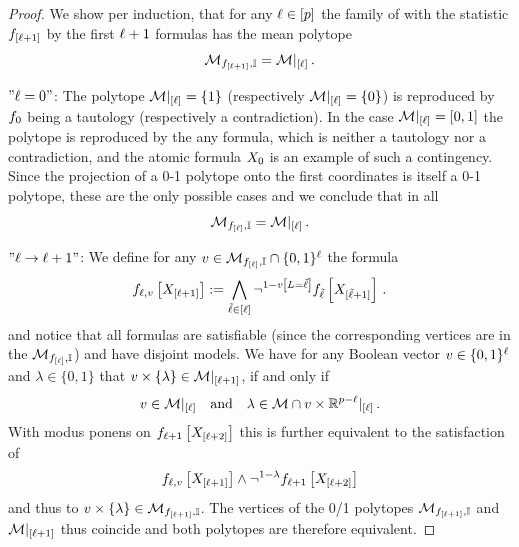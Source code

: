 \begin{proof}
    We show per induction, that for any $\ell\in[p]$ the family of \HybridLogicNetworks{} with the statistic $f_{[\ell+1]}$ by the first $\ell+1$ formulas has the mean polytope
    \begin{align}
        \label{eq:HLNindConTBS}
        \mathcal{M}_{f_{[\ell+1]},\mathbb{I}}
        = {\mathcal{M}}|_{[\ell]} \, .
    \end{align}

    $"\ell=0"$: The polytope ${\mathcal{M}}|_{[\ell]}=\{1\}$ (respectively ${\mathcal{M}}|_{[\ell]}=\{0\}$) is reproduced by $f_{0}$ being a tautology (respectively a contradiction).
    In the case ${\mathcal{M}}|_{[\ell]}=[0,1]$ the polytope is reproduced by the any formula, which is neither a tautology nor a contradiction, and the atomic formula $X_{0}$ is an example of such a contingency.
    Since the projection of a 0-1 polytope onto the first coordinates is itself a 0-1 polytope, these are the only possible cases and we conclude that in all
    \begin{align*}
        \mathcal{M}_{f_{[\ell]},\mathbb{I}}
        = {\mathcal{M}}|_{[\ell]} \, .
    \end{align*}

    $"\ell\rightarrow\ell+1"$:
    We define for any $v\in\mathcal{M}_{f_{[\ell]},\mathbb{I}}\cap\{0,1\}^{\ell}$ the formula
    \begin{align*}
        f_{\ell,v}\left[X_{[\ell+1]}\right]:=
        \bigwedge_{\tilde{\ell}\in[\ell]} \lnot^{1-v\left[L=\tilde{\ell}\right]} f_{\tilde{\ell}}\left[X_{[\tilde{\ell}+1]}\right] \, .
    \end{align*}
    and notice that all formulas are satisfiable (since the corresponding vertices are in the $\mathcal{M}_{f_{[\ell]},\mathbb{I}}$) and have disjoint models.
    We have for any Boolean vector $v\in\{0,1\}^{\ell}$ and $\lambda\in\{0,1\}$ that $v\times\{\lambda\}\in{\mathcal{M}}|_{[\ell+1]}$, if and only if
    \begin{align*}
        v \in {\mathcal{M}}|_{[\ell]} \quad \text{and} \quad
        \lambda \in {\mathcal{M}\cap v\times\mathbb{R}^{p-\ell}}|_{[\ell]} \, .
    \end{align*}
    With modus ponens on $f_{\ell+1}\left[X_{[\ell+2]}\right]$ this is further equivalent to the satisfaction of
    \begin{align*}
        f_{\ell,v}\left[X_{[\ell+1]}\right] \land \lnot^{1-\lambda}f_{\ell+1}\left[X_{[\ell+2]}\right]
    \end{align*}
    and thus to $v\times\{\lambda\}\in\mathcal{M}_{f_{[\ell+1]},\mathbb{I}}$.
    The vertices of the 0/1 polytopes $\mathcal{M}_{f_{[\ell+1]},\mathbb{I}}$ and ${\mathcal{M}}|_{[\ell+1]}$ thus coincide and both polytopes are therefore equivalent.


\end{proof}
